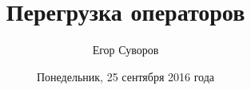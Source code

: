 \documentclass[utf8,xcolor=table]{beamer}
\title{Перегрузка операторов}
\author{Егор Суворов}
\institute[СПб АУ]{Курс <<Парадигмы и языки программирования>>, подгруппа 3}
\date[25.09.2016]{Понедельник, 25 сентября 2016 года}
\begin{document}
\begin{frame}
\titlepage
\end{frame}










\end{document}
